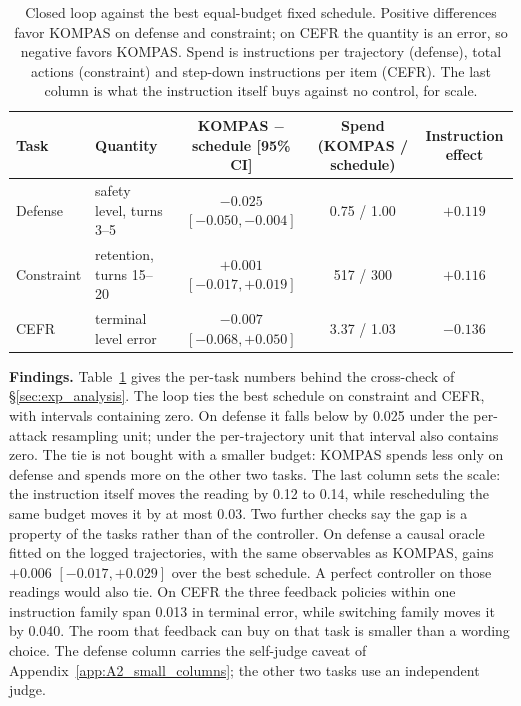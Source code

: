 \begin{table}[t]
\centering
\caption{Closed loop against the best equal-budget fixed schedule. Positive differences favor KOMPAS on defense and constraint; on CEFR the quantity is an error, so negative favors KOMPAS. Spend is instructions per trajectory (defense), total actions (constraint) and step-down instructions per item (CEFR). The last column is what the instruction itself buys against no control, for scale.}
\label{tab:equal_budget}
\scriptsize
\setlength{\tabcolsep}{3pt}
\begin{tabular}{llccc}
\toprule
Task & Quantity & KOMPAS $-$ schedule [95\% CI] & Spend (KOMPAS / schedule) & Instruction effect \\
\midrule
Defense & safety level, turns 3--5 & $-0.025$ $[-0.050, -0.004]$ & 0.75 / 1.00 & $+0.119$ \\  %
Constraint & retention, turns 15--20 & $+0.001$ $[-0.017, +0.019]$ & 517 / 300 & $+0.116$ \\  %
CEFR & terminal level error & $-0.007$ $[-0.068, +0.050]$ & 3.37 / 1.03 & $-0.136$ \\  %
\bottomrule
\end{tabular}
\end{table}

\textbf{Findings.} Table~\ref{tab:equal_budget} gives the per-task numbers behind the cross-check of \S\ref{sec:exp_analysis}.
The loop ties the best schedule on constraint and CEFR, with intervals containing zero.
On defense it falls below by 0.025 under the per-attack resampling unit; under the per-trajectory unit that interval also contains zero.  %
The tie is not bought with a smaller budget: KOMPAS spends less only on defense and spends more on the other two tasks.  %
The last column sets the scale: the instruction itself moves the reading by 0.12 to 0.14, while rescheduling the same budget moves it by at most 0.03.  %
Two further checks say the gap is a property of the tasks rather than of the controller.
On defense a causal oracle fitted on the logged trajectories, with the same observables as KOMPAS, gains $+0.006$ $[-0.017, +0.029]$ over the best schedule.
A perfect controller on those readings would also tie.  %
On CEFR the three feedback policies within one instruction family span 0.013 in terminal error, while switching family moves it by 0.040.
The room that feedback can buy on that task is smaller than a wording choice.  %
The defense column carries the self-judge caveat of Appendix~\ref{app:A2_small_columns}; the other two tasks use an independent judge.  %
